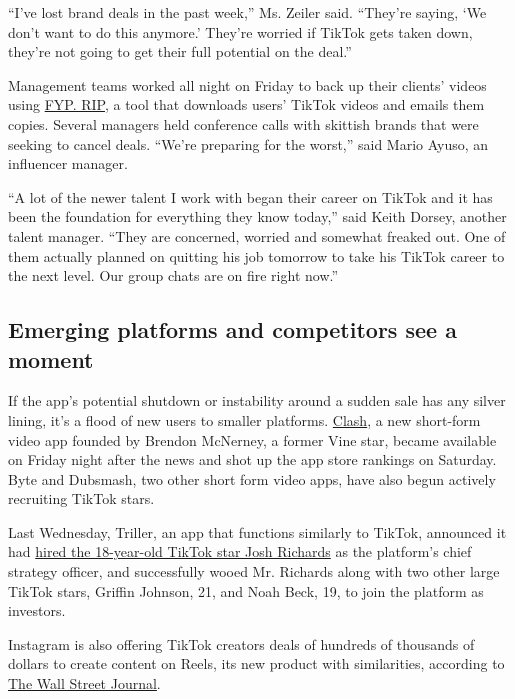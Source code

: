``I've lost brand deals in the past week,'' Ms. Zeiler said. ``They're
saying, `We don't want to do this anymore.' They're worried if TikTok
gets taken down, they're not going to get their full potential on the
deal.''

Management teams worked all night on Friday to back up their clients'
videos using \href{https://www.fyp.rip/}{FYP. RIP,} a tool that
downloads users' TikTok videos and emails them copies. Several managers
held conference calls with skittish brands that were seeking to cancel
deals. ``We're preparing for the worst,'' said Mario Ayuso, an
influencer manager.

``A lot of the newer talent I work with began their career on TikTok and
it has been the foundation for everything they know today,'' said Keith
Dorsey, another talent manager. ``They are concerned, worried and
somewhat freaked out. One of them actually planned on quitting his job
tomorrow to take his TikTok career to the next level. Our group chats
are on fire right now.''

\hypertarget{emerging-platforms-and-competitors-see-a-moment}{%
\subsection{Emerging platforms and competitors see a
moment}\label{emerging-platforms-and-competitors-see-a-moment}}

If the app's potential shutdown or instability around a sudden sale has
any silver lining, it's a flood of new users to smaller platforms.
\href{https://create.clashapp.co/appstore}{Clash}, a new short-form
video app founded by Brendon McNerney, a former Vine star, became
available on Friday night after the news and shot up the app store
rankings on Saturday. Byte and Dubsmash, two other short form video
apps, have also begun actively recruiting TikTok stars.

Last Wednesday, Triller, an app that functions similarly to TikTok,
announced it had
\href{https://www.businessinsider.com/triller-names-tiktok-star-josh-richards-strategy-head-seeks-funding-2020-7}{hired
the 18-year-old TikTok star Josh Richards} as the platform's chief
strategy officer, and successfully wooed Mr. Richards along with two
other large TikTok stars, Griffin Johnson, 21, and Noah Beck, 19, to
join the platform as investors.

Instagram is also offering TikTok creators deals of hundreds of
thousands of dollars to create content on Reels, its new product with
similarities, according to
\href{https://www.wsj.com/articles/facebook-seeks-to-reel-in-tiktok-creators-raising-stakes-in-social-media-rivalry-11595928600?mod=hp_lead_pos3}{The
Wall Street Journal}.

